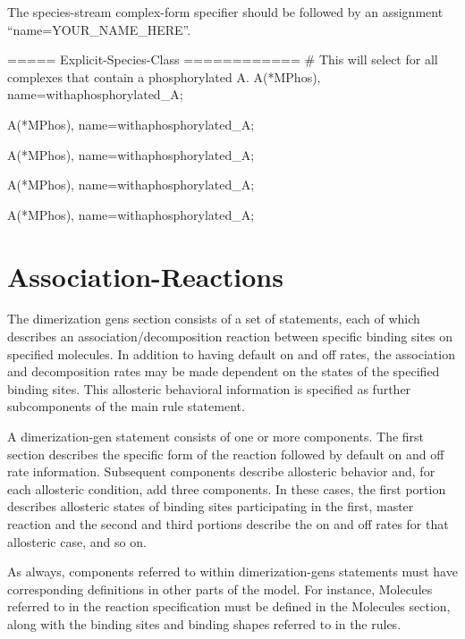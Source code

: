 The species-stream complex-form specifier should be followed by an assignment
``name=YOUR\_NAME\_HERE''.

\begin{ExampleMZR}
===== Explicit-Species-Class ============
# This will select for all complexes that contain a phosphorylated A.
A(*M{Phos}), 
       name=withaphosphorylated\_A;

A(*M{Phos}), 
       name=withaphosphorylated\_A;


A(*M{Phos}), 
       name=withaphosphorylated\_A;


A(*M{Phos}), 
       name=withaphosphorylated\_A;


A(*M{Phos}), 
       name=withaphosphorylated\_A;

\end{ExampleMZR}


\section{Association-Reactions}
The dimerization gens section consists of a set of statements, each of
which describes an association/decomposition reaction between specific
binding sites on specified molecules.  In addition to having default on and
off rates, the association and decomposition rates may be made
dependent on the states of the specified binding sites.  This
allosteric behavioral information is specified as further
subcomponents of the main rule statement.  

A dimerization-gen statement consists of one or more components.  The
first section describes the specific form of the reaction followed by
default on and off rate information.  Subsequent components describe
allosteric behavior and, for each allosteric condition, add three
components. In these cases, the first portion describes allosteric
states of binding sites participating in the first, master reaction
and the second and third portions describe the on and off rates for
that allosteric case, and so on.

As always, components referred to within dimerization-gens statements
must have corresponding definitions in other parts of the model.  For
instance, Molecules referred to in the reaction specification must be
defined in the Molecules section, along with the binding sites and binding
shapes referred to in the rules.  

